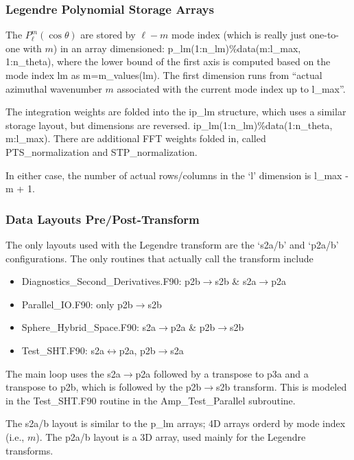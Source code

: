 \documentclass[10pt,letterpaper]{article}
\begin{document}
\subsubsection{Legendre Polynomial Storage Arrays}
The $P_\ell^m\left(\cos\theta\right)$ are stored by $\ell-m$ mode index (which is really
just one-to-one with $m$) in an array
dimensioned: p\_lm(1:n\_lm)\%data(m:l\_max, 1:n\_theta), where the lower bound of the
first axis is computed based on the mode index lm as m=m\_values(lm). The first dimension
runs from ``actual azimuthal wavenumber $m$ associated with the current mode index up to
l\_max''.

The integration weights are folded into the ip\_lm structure, which uses a similar storage
layout, but dimensions are reversed. ip\_lm(1:n\_lm)\%data(1:n\_theta, m:l\_max).
There are additional FFT weights folded in, called PTS\_normalization and STP\_normalization.

In either case, the number of actual rows/columns in the `l' dimension is l\_max - m + 1.

\subsubsection{Data Layouts Pre/Post-Transform}
The only layouts used with the Legendre transform are the `s2a/b' and `p2a/b' configurations.
The only routines that actually call the transform include
\begin{itemize}
 \item Diagnostics\_Second\_Derivatives.F90: p2b$\rightarrow$s2b \& s2a$\rightarrow$p2a
 \item Parallel\_IO.F90: only p2b$\rightarrow$s2b
 \item Sphere\_Hybrid\_Space.F90: s2a$\rightarrow$p2a \& p2b$\rightarrow$s2b
 \item Test\_SHT.F90: s2a$\leftrightarrow$p2a, p2b$\rightarrow$s2a
\end{itemize}
The main loop uses the s2a$\rightarrow$p2a followed by a transpose to p3a and a transpose
to p2b, which is followed by the p2b$\rightarrow$s2b transform. This is modeled in the
Test\_SHT.F90 routine in the Amp\_Test\_Parallel subroutine.

The s2a/b layout is similar to the p\_lm arrays; 4D arrays orderd by mode index (i.e., $m$).
The p2a/b layout is a 3D array, used mainly for the Legendre transforms.
\end{document}

